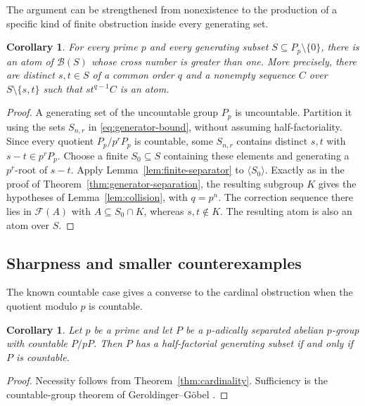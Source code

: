 \documentclass[11pt,reqno]{amsart}
\numberwithin{equation}{section}
\newtheorem{corollary}[theorem]{Corollary}
\theoremstyle{definition}
\theoremstyle{remark}
\newcommand{\B}{\mathcal B}
\newcommand{\F}{\mathcal F}
\begin{document}
The argument can be strengthened from nonexistence to the production
of a specific kind of finite obstruction inside every generating set.

\begin{corollary}\label{cor:universal-large-atom}
For every prime $p$ and every generating subset
$S\subseteq P_p\setminus\{0\}$, there is an atom of $\B(S)$
whose cross number is greater than one. More precisely, there are
distinct $s,t\in S$ of a common order $q$ and a nonempty sequence
$C$ over $S\setminus\{s,t\}$ such that $st^{q-1}C$ is an atom.
\end{corollary}

\begin{proof}
A generating set of the uncountable group $P_p$ is uncountable.
Partition it using the sets $S_{n,r}$ in
\eqref{eq:generator-bound}, without assuming half-factoriality.
Since every quotient $P_p/p^rP_p$ is countable, some $S_{n,r}$
contains distinct $s,t$ with $s-t\in p^rP_p$.
Choose a finite $S_0\subseteq S$ containing these elements and
generating a $p^r$-root of $s-t$. Apply
Lemma~\ref{lem:finite-separator} to $\langle S_0\rangle$.
Exactly as in the proof of Theorem~\ref{thm:generator-separation},
the resulting subgroup $K$ gives the hypotheses of
Lemma~\ref{lem:collision}, with $q=p^n$. The correction sequence
there lies in $\F(A)$ with $A\subseteq S_0\cap K$, whereas
$s,t\notin K$. The resulting atom is also an atom over $S$.
\end{proof}

\subsection{Sharpness and smaller counterexamples}

The known countable case gives a converse to the cardinal obstruction
when the quotient modulo $p$ is countable.

\begin{corollary}\label{cor:countable-criterion}
Let $p$ be a prime and let $P$ be a $p$-adically separated abelian
$p$-group with countable $P/pP$. Then $P$ has a half-factorial
generating subset if and only if $P$ is countable.
\end{corollary}

\begin{proof}
Necessity follows from Theorem~\ref{thm:cardinality}. Sufficiency is
the countable-group theorem of Geroldinger--G\"obel
\cite[Theorem~5.3]{GeroldingerGoebel}.
\end{proof}
\end{document}
